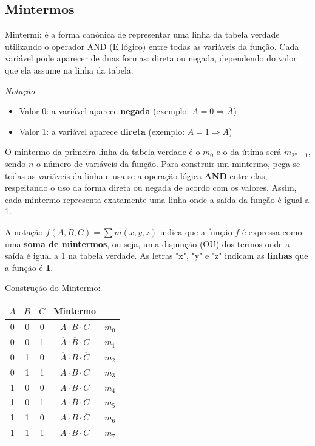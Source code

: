 \documentclass[12pt]{article}
\begin{document}
\subsection{Mintermos}
Mintermi: é a forma canônica de representar uma linha da tabela verdade utilizando o operador AND (E lógico) entre todas as variáveis da função.
Cada variável pode aparecer de duas formas: direta ou negada, dependendo do valor que ela assume na linha da tabela.

\textit{Notação}: 
\begin{itemize}
   \item Valor 0: a variável aparece \textbf{negada} (exemplo: $A = 0 \Rightarrow \overline{A}$)
   \item Valor 1: a variável aparece \textbf{direta} (exemplo: $A = 1 \Rightarrow A$)
\end{itemize}

O mintermo da primeira linha da tabela verdade é o $m_0$ e o da útima será $m_{2^n - 1}$, sendo $n$ o número de variáveis da função.
Para construir um mintermo, pega-se todas as variáveis da linha e usa-se a operação lógica \textbf{AND} entre elas, respeitando o uso da forma direta ou negada de acordo com os valores. Assim, cada mintermo representa exatamente uma linha onde a saída da função é igual a 1.

\begin{tcolorbox}[mynote, title=Notação – Forma Canônica por Mintermos]
A notação \textit{$f(A, B, C) = \sum m(x, y, z)$} indica que a função $f$ é expressa como uma \textbf{soma de mintermos}, ou seja, uma disjunção (OU) dos termos onde a saída é igual a 1 na tabela verdade. As letras "x", "y" e "z" indicam as \textbf{linhas} que a função é \textbf{1}. 
\end{tcolorbox} 

Construção do Mintermo:
\vspace{0.5cm}
\begin{center}
\begin{tabular}{|c|c|c|c|c|}
\hline
$A$ & $B$ & $C$ & Mintermo &\\
\hline
0 & 0 & 0 & $\overline{A}\cdot\overline{B}\cdot\overline{C}$ & $m_0$ \\
0 & 0 & 1 & $\overline{A}\cdot\overline{B}\cdot C$ & $m_1$ \\
0 & 1 & 0 & $\overline{A}\cdot B\cdot\overline{C}$ & $m_2$ \\
0 & 1 & 1 & $\overline{A}\cdot B\cdot C$ & $m_3$ \\
1 & 0 & 0 & $A\cdot\overline{B}\cdot\overline{C}$ & $m_4$ \\
1 & 0 & 1 & $A\cdot\overline{B}\cdot C$ & $m_5$ \\
1 & 1 & 0 & $A\cdot B\cdot\overline{C}$ & $m_6$ \\
1 & 1 & 1 & $A\cdot B\cdot C$ & $m_7$ \\
\hline
\end{tabular}
\end{center}
\vspace{0.5cm}
\end{document}
